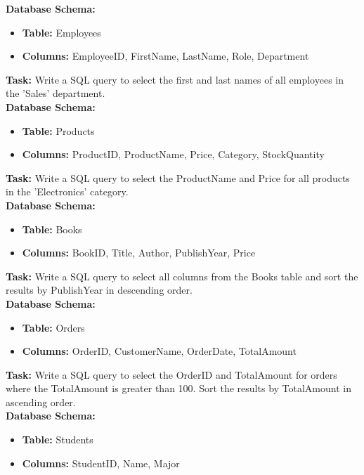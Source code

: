 \textbf{Database Schema:} 
\begin{itemize}
    \item \textbf{Table:} Employees
    \item \textbf{Columns:} EmployeeID, FirstName, LastName, Role, Department
\end{itemize}

\noindent \textbf{Task:} Write a SQL query to select the first and last names of all employees in the 'Sales' department. \\

\noindent \textbf{Database Schema:}
\begin{itemize}
    \item \textbf{Table:} Products
    \item \textbf{Columns:} ProductID, ProductName, Price, Category, StockQuantity
\end{itemize}

\noindent \textbf{Task:} Write a SQL query to select the ProductName and Price for all products in the 'Electronics' category.\\

\noindent \textbf{Database Schema:}
\begin{itemize}
    \item \textbf{Table:} Books
    \item \textbf{Columns:} BookID, Title, Author, PublishYear, Price
\end{itemize}

\noindent \textbf{Task:} Write a SQL query to select all columns from the Books table and sort the results by PublishYear in descending order.\\

\noindent \textbf{Database Schema:}
\begin{itemize}
    \item \textbf{Table:} Orders
    \item \textbf{Columns:} OrderID, CustomerName, OrderDate, TotalAmount
\end{itemize}

\noindent \textbf{Task:} Write a SQL query to select the OrderID and TotalAmount for orders where the TotalAmount is greater than 100. Sort the results by TotalAmount in ascending order.\\

\noindent \textbf{Database Schema:}
\begin{itemize}
    \item \textbf{Table:} Students
    \item \textbf{Columns:} StudentID, Name, Major
\end{itemize}

